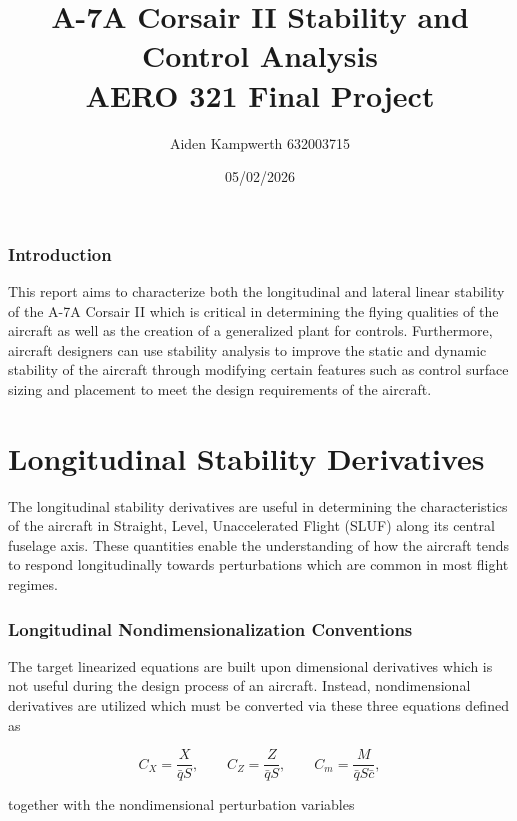 \documentclass[11pt]{article}
\title{A-7A Corsair II Stability and Control Analysis \\
       \large AERO 321 Final Project}
\author{Aiden Kampwerth 632003715}
\date{05/02/2026}
\newcommand{\qbar}{\bar{q}}
\newcommand{\cbar}{\bar{c}}
\begin{document}
\maketitle

\section*{Introduction}

This report aims to characterize both the longitudinal and lateral linear stability of the A-7A Corsair II which is
critical in determining the flying qualities of the aircraft as well as the creation of a generalized plant for controls.
Furthermore, aircraft designers can use stability analysis to improve the static and dynamic stability of the aircraft
through modifying certain features such as control surface sizing and placement to meet the design requirements of the
aircraft.

\part*{Longitudinal Stability Derivatives}

The longitudinal stability derivatives are useful in determining the characteristics of the aircraft in Straight, Level,
Unaccelerated Flight (SLUF) along its central fuselage axis.
These quantities enable the understanding of how the aircraft tends to respond longitudinally towards perturbations
which are common in most flight regimes.

\section{Longitudinal Nondimensionalization Conventions}

The target linearized equations are built upon dimensional derivatives which is not useful during the design process of
an aircraft.
Instead, nondimensional derivatives are utilized which must be converted via these three equations defined as

\begin{equation}\label{eq:equation_1}
C_X = \frac{X}{\qbar S}, \qquad
C_Z = \frac{Z}{\qbar S}, \qquad
C_m = \frac{M}{\qbar S \cbar},
\end{equation}

together with the nondimensional perturbation variables
\end{document}
